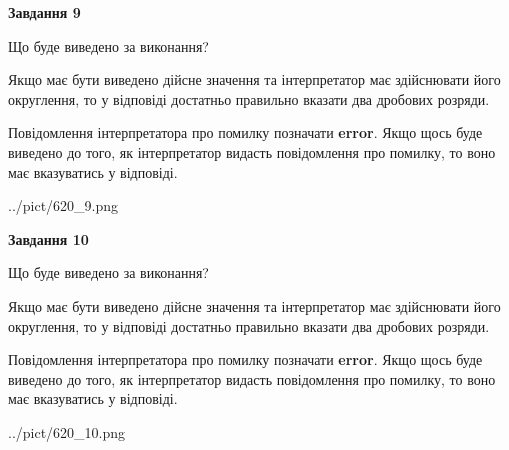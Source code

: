 \documentclass[12pt, ukrainian]{article}
\begin{document}
{\begin {Large}
{\begin {center}\textbf{Завдання 9}\end {center}}\par
Що буде виведено за виконання? \par

Якщо має бути виведено дійсне значення та інтерпретатор має здійснювати його округлення, 
то у відповіді достатньо правильно вказати два дробових розряди.

Повідомлення інтерпретатора про помилку позначати \textbf{error}.
Якщо щось буде виведено до того, як інтерпретатор видасть повідомлення про помилку, 
то воно має вказуватись у відповіді. \par

\begin{center}
	{../pict/620_9.png}
\end{center}
\newpage

{\begin {center}\textbf{Завдання 10}\end {center}}\par
Що буде виведено за виконання? \par

Якщо має бути виведено дійсне значення та інтерпретатор має здійснювати його округлення, 
то у відповіді достатньо правильно вказати два дробових розряди.

Повідомлення інтерпретатора про помилку позначати \textbf{error}.
Якщо щось буде виведено до того, як інтерпретатор видасть повідомлення про помилку, 
то воно має вказуватись у відповіді. \par

\begin{center}
	{../pict/620_10.png}
\end{center}
\newpage

\end {Large}}
\end{document}

